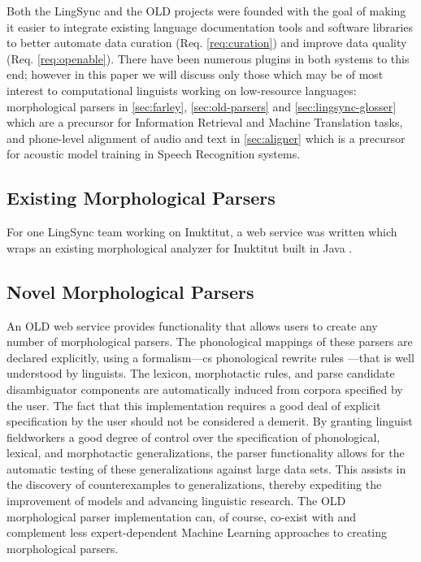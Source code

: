 \documentclass[11pt]{article}
\begin{document}
Both the LingSync and the OLD projects were founded with the goal of making it
easier to integrate existing language documentation tools and software
libraries to better automate data curation (Req. \autoref{req:curation}) and 
improve data quality (Req. \autoref{req:openable}). There have been numerous
plugins in both systems to this end; however in this paper we will discuss only
those which may be of most interest to computational linguists working on
low-resource languages: morphological parsers in \autoref{sec:farley}, 
\autoref{sec:old-parsers} and \autoref{sec:lingsync-glosser} which are a
precursor for Information Retrieval and Machine Translation tasks, and 
phone-level alignment of audio and text in \autoref{sec:aligner} which is a
precursor for acoustic model training in Speech Recognition systems.



\subsection{Existing Morphological Parsers}
\label{sec:farley}

For one LingSync team working on Inuktitut, a web service was written which
wraps an existing morphological analyzer for Inuktitut built in Java
\cite{Farley:2012:Online}.


\subsection{Novel Morphological Parsers}
\label{sec:old-parsers}

An OLD web service provides functionality that allows users to create any
number of morphological parsers. The phonological mappings of these parsers
are declared explicitly, using a formalism---\gls{cs} phonological rewrite
rules \cite{chomsky68}---that is well understood by linguists. The lexicon,
morphotactic rules, and parse candidate disambiguator components are
automatically induced from corpora specified by the user. The fact that this
implementation requires a good deal of explicit specification by the user
should not be considered a demerit. By granting linguist fieldworkers a good
degree of control over the specification of phonological, lexical, and
morphotactic generalizations, the parser functionality allows for the automatic
testing of these generalizations against large data sets. This assists
in the discovery of counterexamples to generalizations, thereby expediting
the improvement of models and advancing linguistic research. The OLD
morphological parser implementation can, of course, co-exist with and
complement less expert-dependent Machine Learning approaches to creating
morphological parsers.
\end{document}
